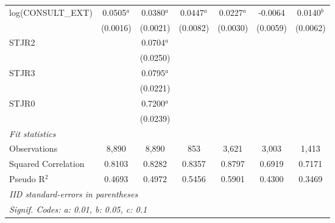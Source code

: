 \begin{tabular}{lcccccc}
   log(CONSULT\_EXT)   & 0.0505$^{a}$ & 0.0380$^{a}$ & 0.0447$^{a}$ & 0.0227$^{a}$ & -0.0064      & 0.0140$^{b}$\\   
                       & (0.0016)     & (0.0021)     & (0.0082)     & (0.0030)     & (0.0059)     & (0.0062)\\   
   STJR2               &              & 0.0704$^{a}$ &              &              &              &   \\   
                       &              & (0.0250)     &              &              &              &   \\   
   STJR3               &              & 0.0795$^{a}$ &              &              &              &   \\   
                       &              & (0.0221)     &              &              &              &   \\   
   STJR0               &              & 0.7200$^{a}$ &              &              &              &   \\   
                       &              & (0.0239)     &              &              &              &   \\   
   \midrule
   \emph{Fit statistics}\\
   Observations        & 8,890        & 8,890        & 853          & 3,621        & 3,003        & 1,413\\  
   Squared Correlation & 0.8103       & 0.8282       & 0.8357       & 0.8797       & 0.6919       & 0.7171\\  
   Pseudo R$^2$        & 0.4693       & 0.4972       & 0.5456       & 0.5901       & 0.4300       & 0.3469\\  
   \midrule \midrule
   \multicolumn{7}{l}{\emph{IID standard-errors in parentheses}}\\
   \multicolumn{7}{l}{\emph{Signif. Codes: a: 0.01, b: 0.05, c: 0.1}}\\
\end{tabular}
\par\endgroup


